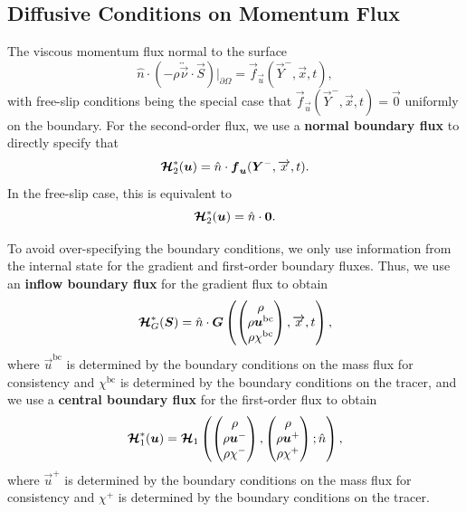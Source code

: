 \documentclass{report}
\numberwithin{equation}{section}
\begin{document}
\subsection{Diffusive Conditions on Momentum Flux}

The viscous momentum flux normal to the surface
\begin{equation}
    \hat n \cdot \left( - \rho \overleftrightarrow{\vec{\nu}} \cdot  \vec S \right)\bigg|_{\partial \Omega} = \vec f_{\vec u}(\vec Y^-, \overrightarrow{x}, t),
\end{equation}
with free-slip conditions being the special case that $\vec f_{\vec u}(\vec Y^-, \overrightarrow{x}, t) = \vec 0$ uniformly on the boundary. 
For the second-order flux, we use a \textbf{normal boundary flux} to directly specify that
\begin{equation}
    \boldsymbol{{\mathcal{H}}}_2^*(\boldsymbol{{u}}) = \hat n \cdot \boldsymbol{{f}}_{\boldsymbol{{u}}}(\boldsymbol{{Y}}^-, \overrightarrow{x}, t).
\end{equation}
In the free-slip case, this is equivalent to
\begin{equation}
    \boldsymbol{{\mathcal{H}}}_2^*(\boldsymbol{{u}}) = \hat n \cdot \boldsymbol{{0}}.
\end{equation} 

To avoid over-specifying the boundary conditions, we only use information from the internal state for the gradient and first-order boundary fluxes. Thus, we use an \textbf{inflow boundary flux} for the gradient flux to obtain
\begin{equation}
    \boldsymbol{{\mathcal{H}}}_G^*(\boldsymbol{{S}}) = \hat n \cdot \boldsymbol{{G}} \left(\begin{pmatrix} \rho \\ \rho \boldsymbol{{u}}^{\text{bc}} \\ \rho \chi^{\text{bc}} \end{pmatrix} , \overrightarrow{x}, t \right),
\end{equation}
where $\vec u^{\text{bc}}$ is determined by the boundary conditions on the mass flux for consistency and $\chi^{\text{bc}}$ is determined by the boundary conditions on the tracer, and we use a \textbf{central boundary flux} for the first-order flux to obtain
\begin{equation}
    \boldsymbol{{\mathcal{H}}}_1^*(\boldsymbol{{u}}) = \boldsymbol{{\mathcal{H}}}_1 \left(
        \begin{pmatrix} \rho \\ \rho \boldsymbol{{u}}^- \\ \rho \chi^- \end{pmatrix}, 
        \begin{pmatrix} \rho \\ \rho \boldsymbol{{u}}^+ \\ \rho \chi^+ \end{pmatrix}; 
        \hat n
    \right),
\end{equation}
where $\vec u^+$ is determined by the boundary conditions on the mass flux for consistency and $\chi^+$ is determined by the boundary conditions on the tracer.
\end{document}

